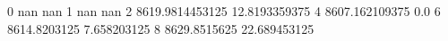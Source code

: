 0 nan nan
1 nan nan
2 8619.9814453125 12.8193359375
4 8607.162109375 0.0
6 8614.8203125 7.658203125
8 8629.8515625 22.689453125
